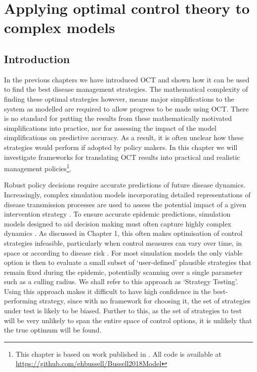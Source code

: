 %
\chapter{Applying optimal control theory to complex models\label{ch:complex_models}}

\section{Introduction\label{sec:ch4:Intro}}

In the previous chapters we have introduced OCT and shown how it can be used to find the best disease management strategies. The mathematical complexity of finding these optimal strategies however, means major simplifications to the system as modelled are required to allow progress to be made using OCT\@. There is no standard for putting the results from these mathematically motivated simplifications into practice, nor for assessing the impact of the model simplifications on predictive accuracy. As a result, it is often unclear how these strategies would perform if adopted by policy makers. In this chapter we will investigate frameworks for translating OCT results into practical and realistic management policies\footnote{This chapter is based on work published in \citet{bussell_applying_2019}. All code is available at \url{https://github.com/ehbussell/Bussell2018Model}}.

Robust policy decisions require accurate predictions of future disease dynamics. Increasingly, complex simulation models incorporating detailed representations of disease transmission processes are used to assess the potential impact of a given intervention strategy \citep{lofgren_opinion_2014}. To ensure accurate epidemic predictions, simulation models designed to aid decision making must often capture highly complex dynamics \citep[Chapter 1,][]{savary_simulation_2014}. As discussed in Chapter 1, this often makes optimisation of control strategies infeasible, particularly when control measures can vary over time, in space or according to disease risk \citep{bellman_dynamic_1957}. For most simulation models the only viable option is then to evaluate a small subset of `user-defined' plausible strategies that remain fixed during the epidemic, potentially scanning over a single parameter such as a culling radius. We shall refer to this approach as `Strategy Testing'. Using this approach makes it difficult to have high confidence in the best-performing strategy, since with no framework for choosing it, the set of strategies under test is likely to be biased. Further to this, as the set of strategies to test will be very unlikely to span the entire space of control options, it is unlikely that the true optimum will be found.

